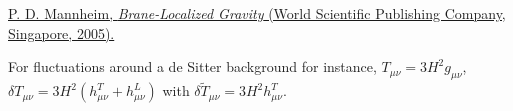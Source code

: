 \documentclass[aps,onecolumn,10pt]{revtex4}
\numberwithin{equation}{section}
\numberwithin{equation}{section}
\begin{document}
\begin{thebibliography}{99}
  \href{https://doi.org/10.1142/5975}{P. D. Mannheim, \textit{Brane-Localized Gravity} (World Scientific Publishing Company, Singapore, 2005).}

 For fluctuations around a de Sitter background for instance, $T_{\mu\nu}=3H^2g_{\mu\nu}$, $\delta T_{\mu\nu}=3H^2(h^T_{\mu\nu}+h^L_{\mu\nu})$ with $\delta \tilde{T}_{\mu\nu}=3H^2h^T_{\mu\nu}$.











\end{thebibliography} 
\end{document}

